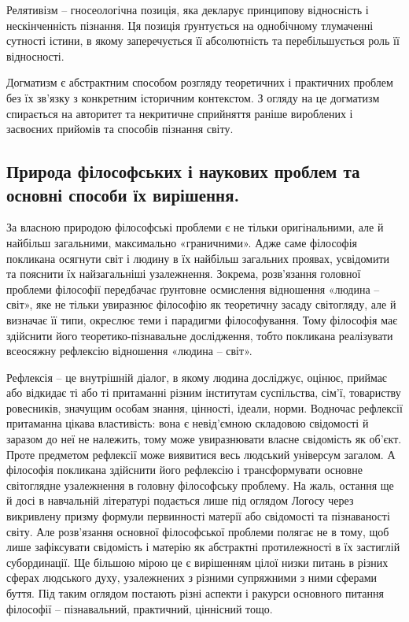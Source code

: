 Релятивізм – гносеологічна позиція, яка декларує принципову відносність і
нескінченність пізнання. Ця позиція ґрунтується на однобічному тлумаченні
сутності істини, в якому заперечується її абсолютність та перебільшується роль
її відносності.

Догматизм є абстрактним способом розгляду теоретичних і практичних
проблем без їх зв’язку з конкретним історичним контекстом. З огляду на це
догматизм спирається на авторитет та некритичне сприйняття раніше
вироблених і засвоєних прийомів та способів пізнання світу.

\subsection[Природа та вирішення філософських і наукових проблем]{Природа філософських і наукових проблем та основні спо\-соби їх вирішення.}
За власною природою філософські проблеми є не тільки
оригінальними, але й найбільш загальними, максимально «граничними». Адже
саме філософія покликана осягнути світ і людину в їх найбільш загальних 
проявах, усвідомити та пояснити їх найзагальніші узалежнення. Зокрема,
розв’язання головної проблеми філософії передбачає ґрунтовне осмислення
відношення «людина – світ», яке не тільки увиразнює філософію як теоретичну
засаду світогляду, але й визначає її типи, окреслює теми і парадигми
філософування. Тому філософія має здійснити його теоретико-пізнавальне
дослідження, тобто покликана реалізувати всеосяжну рефлексію відношення
«людина – світ».

Рефлексія – це внутрішній діалог, в якому людина досліджує, оцінює,
приймає або відкидає ті або ті притаманні різним інститутам суспільства, сім’ї,
товариству ровесників, значущим особам знання, цінності, ідеали, норми.
Водночас рефлексії притаманна цікава властивість: вона є невід’ємною
складовою свідомості й заразом до неї не належить, тому може увиразнювати
власне свідомість як об’єкт. Проте предметом рефлексії може виявитися весь
людський універсум загалом. А філософія покликана здійснити його рефлексію
і трансформувати основне світоглядне узалежнення в головну філософську
проблему. На жаль, остання ще й досі в навчальній літературі подається лише
під оглядом Логосу через викривлену призму формули первинності матерії або
свідомості та пізнаваності світу. Але розв’язання основної філософської
проблеми полягає не в тому, щоб лише зафіксувати свідомість і матерію як
абстрактні протилежності в їх застиглій субординації. Ще більшою мірою це є
вирішенням цілої низки питань в різних сферах людського духу, узалежнених з
різними супряжними з ними сферами буття. Під таким оглядом постають різні
аспекти і ракурси основного питання філософії – пізнавальний, практичний,
ціннісний тощо.

